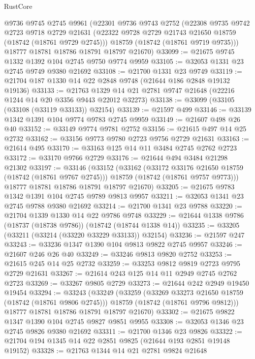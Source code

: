 \begin{lexlean}{RustCore}
\begin{coremodule}
    @9736
    @9745
    @2745
    @9961
    (@22301
      @9736
      @9743
      @2752
      (@22308
        @9735
        @9742
        @2723
        @9718
        @2729
        @21631
        (@22322 @9728 @2729 @21743 @21650 @18759 (@18742 (@18761 @9729 @2745)))
        @18759
        (@18742 (@18761 @9719 @9735)))
      @18777
      @18781
      @18786
      @18791
      @18797
      @21670)
@33099 := @21675 @9745 @1332 @1392 @104 @2745 @9750 @9774 @9959
@33105 := @32053 @1331 @23 @2745 @9749 @9380 @21692
@33108 := @21700 @1331 @23 @9749
@33119 := @21704 @187 @1330 @14 @22 @2848 @9748 (@21644 @186 @2848 @19132 @19136)
@33133 := @21763 @1329 @14 @21 @2781 @9747 @21648 (@22216 @1244 @14 @20 @3356 @9443 @22012 @32273)
@33138 := @33099 (@33105 (@33108 (@33119 @33133)) @32154)
@33139 := @21597 @499
@33146 := @33139 @1342 @1391 @104 @9774 @9783 @2745 @9959
@33149 := @21607 @498 @26 @40
@33152 := @33149 @9774 @9781 @2752
@33156 := @21615 @497 @14 @25 @2732
@33162 := @33156 @9773 @9780 @2723 @9756 @2729 @21631
@33163 := @21614 @495
@33170 := @33163 @125 @14 @11 @3484 @2745 @2762 @2723
@33172 := @33170 @9766 @2729
@33176 := @21644 @494 @3484 @21298 @21302
@33197 := @33146
    (@33152
      (@33162
        (@33172 @33176 @21650 @18759 (@18742 (@18761 @9767 @2745)))
        @18759
        (@18742 (@18761 @9757 @9773)))
      @18777
      @18781
      @18786
      @18791
      @18797
      @21670)
@33205 := @21675 @9783 @1342 @1391 @104 @2745 @9789 @9813 @9957
@33211 := @32053 @1341 @23 @2745 @9788 @9380 @21692
@33214 := @21700 @1341 @23 @9788
@33220 := @21704 @1339 @1330 @14 @22 @9786 @9748
@33229 := @21644 @1338 @9786 (@18737 (@18738 @9786)) (@18742 (@18744 @1338 @14))
@33235 := @33205 (@33211 (@33214 (@33220 @33229 @33133)) @32154)
@33236 := @21597 @247
@33243 := @33236 @1347 @1390 @104 @9813 @9822 @2745 @9957
@33246 := @21607 @246 @26 @40
@33249 := @33246 @9813 @9820 @2752
@33253 := @21615 @245 @14 @25 @2732
@33259 := @33253 @9812 @9819 @2723 @9795 @2729 @21631
@33267 := @21614 @243 @125 @14 @11 @2949 @2745 @2762 @2723
@33269 := @33267 @9805 @2729
@33273 := @21644 @242 @2949 @19450 @19454
@33294 := @33243
    (@33249
      (@33259
        (@33269 @33273 @21650 @18759 (@18742 (@18761 @9806 @2745)))
        @18759
        (@18742 (@18761 @9796 @9812)))
      @18777
      @18781
      @18786
      @18791
      @18797
      @21670)
@33302 := @21675 @9822 @1347 @1390 @104 @2745 @9827 @9851 @9955
@33308 := @32053 @1346 @23 @2745 @9826 @9380 @21692
@33311 := @21700 @1346 @23 @9826
@33322 := @21704 @194 @1345 @14 @22 @2851 @9825 (@21644 @193 @2851 @19148 @19152)
@33328 := @21763 @1344 @14 @21 @2781 @9824 @21648

\end{coremodule}
\end{lexlean}
